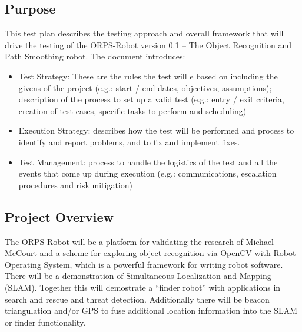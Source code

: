 \documentclass[english,12pt]{article}
\begin{document}
\subsection{Purpose}
This test plan describes the testing approach and overall 
framework that will drive the testing of the ORPS-Robot 
version 0.1 – The Object Recognition and Path Smoothing 
robot. The document introduces:
\begin{itemize}
	\item[] Test Strategy: These are the rules the test will e based on including 
    the givens of the project (e.g.: start / end dates, objectives, assumptions); 
    description of the process to set up a valid test (e.g.: entry / exit criteria, 
    creation of test cases, specific tasks to perform and scheduling)
	\item[] Execution Strategy: describes how the test will be performed 
    and process to identify and report problems, and to fix and implement 
    fixes.
    \item[] Test Management: process to handle the logistics of the test 
    and all the events that come up during execution (e.g.: communications, 
    escalation procedures and risk mitigation)
\end{itemize}
\subsection{Project Overview}
The ORPS-Robot will be a platform for validating the research of Michael McCourt 
and a scheme for exploring object recognition via OpenCV with Robot Operating System, 
which is a powerful framework for writing robot software. There will be a demonstration 
of Simultaneous Localization and Mapping (SLAM). Together this will demostrate a ``finder
robot'' with applications in search and rescue and threat detection. Additionally there 
will be beacon triangulation and/or GPS to fuse additional location information into the 
SLAM or finder functionality.
\end{document}
